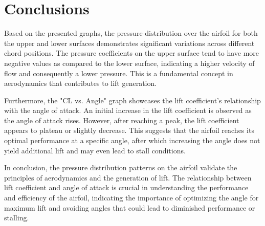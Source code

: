 \section{Conclusions}
\FloatBarrier %

Based on the presented graphs, the pressure distribution over the airfoil for both the upper and lower surfaces demonstrates significant variations across different chord positions. The pressure coefficients on the upper surface tend to have more negative values as compared to the lower surface, indicating a higher velocity of flow and consequently a lower pressure. This is a fundamental concept in aerodynamics that contributes to lift generation.

Furthermore, the "CL vs. Angle" graph showcases the lift coefficient's relationship with the angle of attack. An initial increase in the lift coefficient is observed as the angle of attack rises. However, after reaching a peak, the lift coefficient appears to plateau or slightly decrease. This suggests that the airfoil reaches its optimal performance at a specific angle, after which increasing the angle does not yield additional lift and may even lead to stall conditions.

In conclusion, the pressure distribution patterns on the airfoil validate the principles of aerodynamics and the generation of lift. The relationship between lift coefficient and angle of attack is crucial in understanding the performance and efficiency of the airfoil, indicating the importance of optimizing the angle for maximum lift and avoiding angles that could lead to diminished performance or stalling.